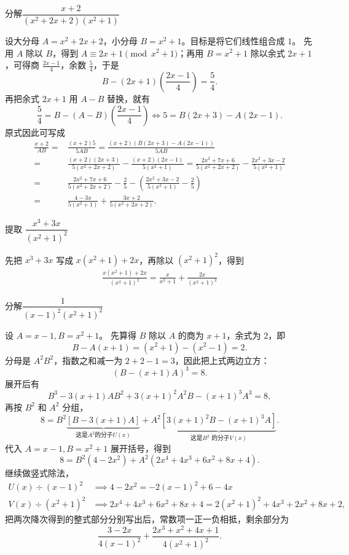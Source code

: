 \begin{example}[分解$\frac{x+2}{(x^2+2x+2)(x^2+1)}$]
分解$\dfrac{x+2}{(x^2+2x+2)(x^2+1)}$
\end{example}
\begin{solution}
设大分母 $A = x^2+2x+2$，小分母 $B = x^2+1$。目标是将它们线性组合成 $1$。
先用 $A$ 除以 $B$，得到 $A \equiv 2x+1 \pmod{x^2+1}$；再用 $B=x^2+1$ 除以余式 $2x+1$，可得商 $\frac{2x-1}{4}$，余数 $\frac{5}{4}$，于是
\[
B - (2x+1)\left(\frac{2x-1}{4}\right) = \frac{5}{4}.
\]
再把余式 $2x+1$ 用 $A-B$ 替换，就有
\[
\frac{5}{4} = B - (A - B)\left(\frac{2x-1}{4}\right)\Leftrightarrow 5 = B\left(2x+3\right) - A\left(2x-1\right).
\]
原式因此可写成
\begin{align*}
\frac{x+2}{AB}=&\frac{(x+2)5}{5AB}=\frac{(x+2)\left( B\left(2x+3\right) - A\left(2x-1\right)\right)}{5AB}\\
=&\frac{(x+2)(2x+3)}{5(x^2+2x+2)} - \frac{(x+2)(2x-1)}{5(x^2+1)}=\frac{2x^2+7x+6}{5(x^2+2x+2)} - \frac{2x^2+3x-2}{5(x^2+1)}\\
=&\frac{2x^2+7x+6}{5(x^2+2x+2)}-\frac25 - \left(\frac{2x^2+3x-2}{5(x^2+1)}-\frac25\right)\\
=&\frac{4-3x}{5(x^2+1)}+ \frac{3x+2}{5(x^2+2x+2)}.
\end{align*}
\end{solution}

\begin{example}[提取 $\frac{x^3+3x}{(x^2+1)^2}$]
提取 $\dfrac{x^3+3x}{(x^2+1)^2}$
\end{example}
\begin{solution}
先把 \(x^3+3x\) 写成 \(x(x^2+1)+2x\)，再除以 \((x^2+1)^2\)，得到
\begin{align*}
\frac{x(x^2+1) + 2x}{(x^2+1)^2} = {\frac{x}{x^2+1} + \frac{2x}{(x^2+1)^2}} 
\end{align*}
\end{solution}

\begin{example}[分解$\frac{1}{(x-1)^2(x^2+1)^2}$]
分解$\dfrac{1}{(x-1)^2(x^2+1)^2}$
\end{example}
\begin{solution}
设 $A = x-1, B = x^2+1$。
先算得 $B$ 除以 $A$ 的商为 $x+1$，余式为 $2$，即
$$ B - A(x+1) = (x^2+1) - (x^2-1) = 2. $$
分母是 $A^2B^2$，指数之和减一为 $2+2-1=3$，因此把上式两边立方：
$$ \left(B - (x+1)A\right)^3=8. $$
展开后有
$$ B^3-3(x+1)AB^2+3(x+1)^2A^2B-(x+1)^3A^3=8, $$
再按 $B^2$ 和 $A^2$ 分组，
$$ 8 = B^2 \underbrace{\left[ B -3(x+1)A \right]}_{\text{这是} A^2 \text{的分子} U(x)} + A^2 \underbrace{\left[ {3(x+1)^2}B - (x+1)^3A \right]}_{\text{这是} B^2\text{ 的分子} V(x)}. $$
代入 $A = x-1, B = x^2+1$ 展开括号，得到
$$ 8=B^2(4-2x^2)+A^2(2x^4+4x^3+6x^2+8x+4). $$
继续做竖式除法，
\begin{align*}
U(x) \div (x-1)^2 &\implies 4-2x^2 =-2(x-1)^2 + 6-4x\\
V(x) \div (x^2+1)^2 &\implies 2x^4+4x^3+6x^2+8x+4= 2(x^2+1)^2 +4x^3+2x^2+8x+2,
\end{align*}
把两次降次得到的整式部分分别写出后，常数项一正一负相抵，剩余部分为
$$ \frac{3-2x}{4(x-1)^2} + \frac{2x^3+x^2+4x+1}{4(x^2+1)^2}. $$
\end{solution}



